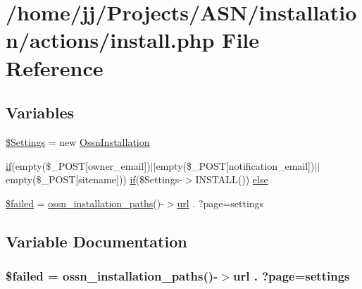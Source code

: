 \hypertarget{install_8php}{}\section{/home/jj/\+Projects/\+A\+S\+N/installation/actions/install.php File Reference}
\label{install_8php}
\subsection*{Variables}
\begin{DoxyCompactItemize}
\item 
\hyperlink{install_8php_a2c1da60c6cd872abbb042bcd58b7c10d}{\$\+Settings} = new \hyperlink{class_ossn_installation}{Ossn\+Installation}
\item 
\hyperlink{jquery_8tokeninput_8js_ad8dd46a3cbc004569e34401e9e71771a}{if}(empty(\$\+\_\+\+P\+O\+ST\mbox{[}\textquotesingle{}owner\+\_\+email\textquotesingle{}\mbox{]})$\vert$$\vert$empty(\$\+\_\+\+P\+O\+ST\mbox{[}\textquotesingle{}notification\+\_\+email\textquotesingle{}\mbox{]})$\vert$$\vert$empty(\$\+\_\+\+P\+O\+ST\mbox{[}\textquotesingle{}sitename\textquotesingle{}\mbox{]})) \hyperlink{jquery_8tokeninput_8js_ad8dd46a3cbc004569e34401e9e71771a}{if}(\$Settings-\/$>$I\+N\+S\+T\+A\+LL()) \hyperlink{install_8php_a6207c145d0aa66335d74eeeef0b54fb7}{else}
\item 
\hyperlink{install_8php_a145d4f1dd5e06d4d3d49ebc01751747a}{\$failed} = \hyperlink{ossn_8install_8php_aee293727c85b476f39c8c4d5a1774b48}{ossn\+\_\+installation\+\_\+paths}()-\/$>$\hyperlink{ossn_8config_8site_8example_8php_ad643c3db2725019ef8130393d549e6db}{url} . \textquotesingle{}?page=settings\textquotesingle{}
\end{DoxyCompactItemize}


\subsection{Variable Documentation}
\subsubsection[{\texorpdfstring{\$failed}{$failed}}]{\setlength{\rightskip}{0pt plus 5cm}\$failed = {\bf ossn\+\_\+installation\+\_\+paths}()-\/$>${\bf url} . \textquotesingle{}?page=settings\textquotesingle{}}\hypertarget{install_8php_a145d4f1dd5e06d4d3d49ebc01751747a}{}\label{install_8php_a145d4f1dd5e06d4d3d49ebc01751747a}


